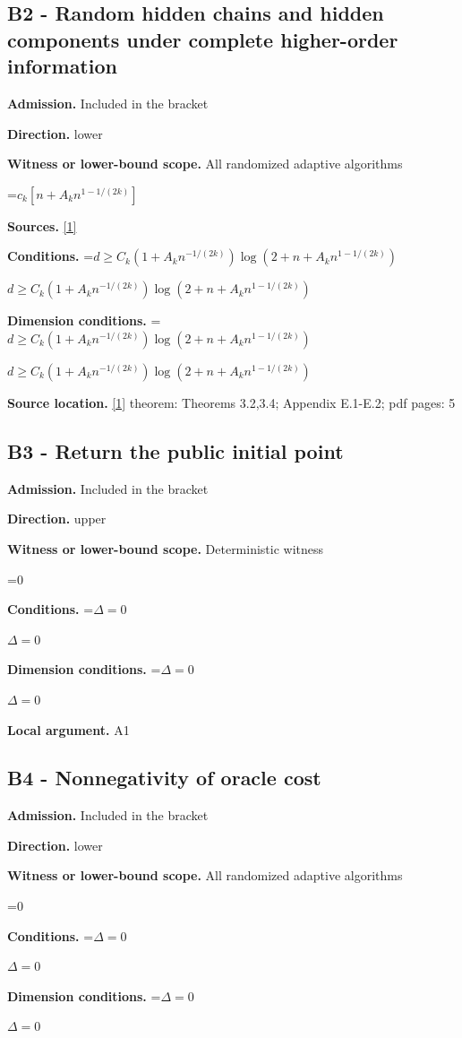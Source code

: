 \documentclass[10pt,a4paper]{article}
\newcommand{\AtlasMath}[1]{\par\begingroup\centering\setbox0=\hbox{$\displaystyle #1$}\ifdim\wd0>1.4\linewidth\typeout{ATLAS WIDE FORMULA: \the\wd0}\fi\ifdim\wd0>\linewidth\resizebox{\linewidth}{!}{\box0}\else\box0\fi\par\endgroup}
\newcommand{\AtlasInlineMath}[1]{\begingroup\setbox0=\hbox{$#1$}\ifdim\wd0>.4\linewidth\endgroup\AtlasMath{#1}\else\endgroup$#1$\fi}
\begin{document}
\subsection{B2 - Random hidden chains and hidden components under complete higher-order information}
\textbf{Admission.} Included in the bracket

\textbf{Direction.} lower

\textbf{Witness or lower-bound scope.} All randomized adaptive algorithms

\AtlasMath{c_k[n+A_kn^{1-1/(2k)}]}
\textbf{Sources.} \href{https://arxiv.org/pdf/2609.28202v2}{[1]}

\textbf{Conditions.} \AtlasInlineMath{d\ge C_k(1+A_kn^{-1/(2k)})\log(2+n+A_kn^{1-1/(2k)})}

\textbf{Dimension conditions.} \AtlasInlineMath{d\ge C_k(1+A_kn^{-1/(2k)})\log(2+n+A_kn^{1-1/(2k)})}

\textbf{Source location.} \href{https://arxiv.org/pdf/2609.28202v2}{[1]} theorem: Theorems 3.2,3.4; Appendix E.1-E.2; pdf pages: 5

\subsection{B3 - Return the public initial point}
\textbf{Admission.} Included in the bracket

\textbf{Direction.} upper

\textbf{Witness or lower-bound scope.} Deterministic witness

\AtlasMath{0}
\textbf{Conditions.} \AtlasInlineMath{\Delta=0}

\textbf{Dimension conditions.} \AtlasInlineMath{\Delta=0}

\textbf{Local argument.} A1

\subsection{B4 - Nonnegativity of oracle cost}
\textbf{Admission.} Included in the bracket

\textbf{Direction.} lower

\textbf{Witness or lower-bound scope.} All randomized adaptive algorithms

\AtlasMath{0}
\textbf{Conditions.} \AtlasInlineMath{\Delta=0}

\textbf{Dimension conditions.} \AtlasInlineMath{\Delta=0}
\end{document}
